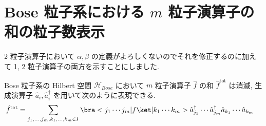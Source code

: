 \documentclass[uplatex,dvipdfmx,a4paper,11pt]{jlreq}
\newcommand{\HH}{\mathcal{H}}
\numberwithin{equation}{section}
\theoremstyle{definition}
\begin{document}
\section{Bose 粒子系における $m$ 粒子演算子の和の粒子数表示}
2 粒子演算子において $\alpha, \beta$ の定義がよろしくないのでそれを修正するのに加えて 1, 2 粒子演算子の両方を示すことにしました.
\begin{theorem}
  Bose 粒子系の Hilbert 空間 $\HH_{Bose}$ において $m$ 粒子演算子 $\hat{f}$ の和 $\hat{f}^{\mathrm{tot}}$ は消滅, 生成演算子 $\hat{a}_i, \hat{a}_i^\dagger$ を用いて次のように表現できる.
  \begin{align}
    \hat{f}^{\mathrm{tot}} & = \sum_{j_1,\ldots,j_m,k_1,\ldots,k_m\in I}\bra<j_1\cdots j_m|f\ket|k_1\cdots k_m>\hat{a}_{j_1}^\dagger\cdots\hat{a}_{j_m}^\dagger\hat{a}_{k_1}\cdots\hat{a}_{k_m}
  \end{align}
\end{theorem}
\end{document}
